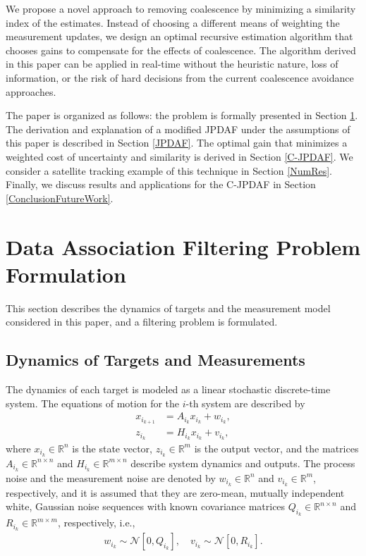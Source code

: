 \documentclass[letterpaper, 10pt, conference]{ieeeconf}
\renewcommand{\Re}{\ensuremath{\mathbb{R}}}
\begin{document}
We propose a novel approach to removing coalescence by minimizing a similarity index of the estimates.
Instead of choosing a different means of weighting the measurement updates, we design an optimal recursive estimation algorithm that chooses gains to compensate for the effects of coalescence.
The algorithm derived in this paper can be applied in real-time without the heuristic nature, loss of information, or the risk of hard decisions from the current coalescence avoidance approaches.

The paper is organized as follows: the problem is formally presented in Section \ref{ProbDef}.
The derivation and explanation of a modified JPDAF under the assumptions of this paper is described in Section \ref{JPDAF}.
The optimal gain that minimizes a weighted cost of uncertainty and similarity is derived in Section \ref{C-JPDAF}.
We consider a satellite tracking example of this technique in Section \ref{NumRes}.
Finally, we discuss results and applications for the C-JPDAF in Section \ref{ConclusionFutureWork}.



\section{Data Association Filtering Problem Formulation}
\label{ProbDef}

This section describes the dynamics of targets and the measurement model considered in this paper, and a filtering problem is formulated. 

\subsection{Dynamics of Targets and Measurements}

The dynamics of each target is modeled as a linear stochastic discrete-time system. The equations of motion for the $i$-th system are described by
\begin{align}
x_{i_{k+1}} & = A_{i_k} x_{i_k} + w_{i_k},\label{eqn:xkp}\\
z_{i_k} & = H_{i_k} x_{i_k} + v_{i_k},
\end{align}
where $x_{i_k}\in\Re^n$ is the state vector, $z_{i_k}\in\Re^m$ is the output vector, and  the matrices $A_{i_k}\in\Re^{n\times n}$ and $H_{i_k}\in\Re^{m\times n}$ describe system dynamics and outputs. The process noise and the measurement noise are denoted by $w_{i_k}\in\Re^n$ and $v_{i_k}\in\Re^m$, respectively, and it is assumed that they are zero-mean, mutually independent white, Gaussian noise sequences with known covariance matrices $Q_{i_k}\in\Re^{n\times n}$ and $R_{i_k}\in\Re^{m\times m}$, respectively, i.e.,
\begin{align}
w_{i_k} \sim \mathcal{N}[0,Q_{i_k}],\quad
v_{i_k} \sim \mathcal{N}[0,R_{i_k}].
\end{align}
\end{document}
